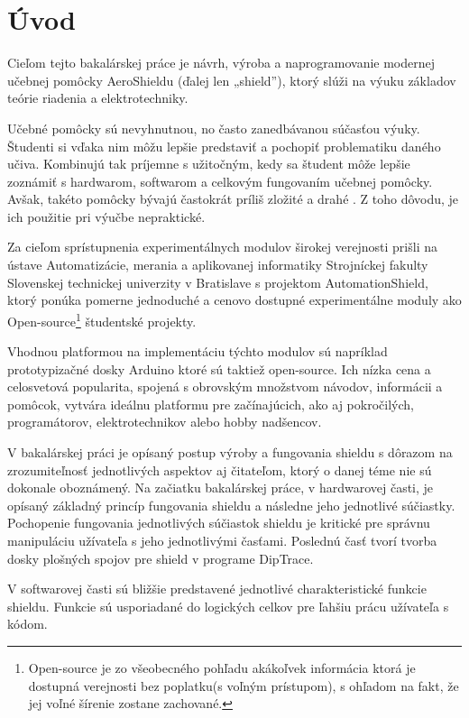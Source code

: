 \chapter*{Úvod}
\label{UVOD}


Cieľom tejto bakalárskej práce je návrh, výroba a naprogramovanie modernej učebnej pomôcky AeroShieldu (ďalej len „shield”), ktorý slúži na výuku základov teórie riadenia a elektrotechniky.

Učebné pomôcky sú nevyhnutnou, no často zanedbávanou súčasťou výuky. Študenti si vďaka nim môžu lepšie predstaviť a pochopiť problematiku daného učiva. Kombinujú tak príjemne s užitočným, kedy sa študent môže lepšie zoznámiť s hardwarom, softwarom a celkovým fungovaním učebnej pomôcky.
Avšak, takéto pomôcky bývajú častokrát príliš zložité a drahé \cite{Hor}. Z toho dôvodu, je ich použitie pri výučbe nepraktické.

Za cieľom sprístupnenia experimentálnych modulov širokej verejnosti prišli na ústave Automatizácie, merania a aplikovanej informatiky
Strojníckej fakulty Slovenskej technickej univerzity v Bratislave s projektom AutomationShield, ktorý ponúka pomerne jednoduché a cenovo dostupné experimentálne moduly ako Open-source\footnote[1]{Open-source je zo všeobecného pohľadu akákoľvek informácia ktorá je dostupná verejnosti bez poplatku(s voľným prístupom), s ohľadom na fakt, že jej voľné šírenie zostane zachované.} študentské projekty.

Vhodnou platformou na implementáciu týchto modulov sú napríklad prototypizačné dosky Arduino ktoré sú taktiež open-source. Ich nízka cena a celosvetová popularita, spojená s obrovským množstvom návodov, informácii a pomôcok, vytvára ideálnu platformu pre začínajúcich, ako aj pokročilých, programátorov, elektrotechnikov alebo hobby nadšencov.

V bakalárskej práci je opísaný postup výroby a fungovania shieldu s dôrazom na zrozumiteľnosť jednotlivých aspektov aj čitateľom, ktorý o danej téme nie sú dokonale oboznámený. Na začiatku bakalárskej práce, v hardwarovej časti, je opísaný základný princíp fungovania shieldu a následne jeho jednotlivé súčiastky. Pochopenie fungovania jednotlivých súčiastok shieldu je kritické pre správnu manipuláciu užívateľa s jeho jednotlivými časťami. Poslednú časť tvorí tvorba dosky plošných spojov pre shield v programe DipTrace.

V softwarovej časti sú bližšie predstavené jednotlivé charakteristické funkcie shieldu. Funkcie sú usporiadané do logických celkov pre ľahšiu prácu užívateľa s kódom.

